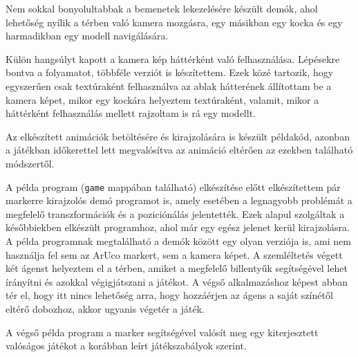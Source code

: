 Nem sokkal bonyolultabbak a bemenetek lekezelésére készült demók, ahol lehetőség nyílik a térben való kamera mozgásra, egy másikban egy kocka és egy harmadikban egy modell navigálására.

Külön hangsúlyt kapott a kamera kép háttérként való felhasználása. Lépésekre bontva a folyamatot, többféle verziót is készítettem. Ezek közé tartozik, hogy egyszerűen csak textúraként felhasználva az ablak hátterének állítottam be a kamera képet, mikor egy kockára helyeztem textúraként, valamit, mikor a háttérként felhasználás mellett rajzoltam is rá egy modellt.

Az elkészített animációk betöltésére és kirajzolására is készült példakód, azonban a játékban időkerettel lett megvalósítva az animáció eltérően az ezekben található módszertől.

A példa program (\texttt{game} mappában található) elkészítése előtt elkészítettem pár markerre kirajzolós demó programot is, amely esetében a legnagyobb problémát a megfelelő transzformációk és
a poziciónálás jelentették. Ezek alapul szolgáltak a későbbiekben elkészült programhoz, ahol már egy egész jelenet kerül kirajzolásra.
A példa programnak megtalálható a demók között egy olyan verziója is, ami nem használja fel sem az ArUco markert, sem a kamera képet. 
A szemléltetés végett két ágenst helyeztem el a térben, amiket a megfelelő billentyűk segítségével lehet írányítni és azokkal végigjátszani a játékot.
A végső alkalmazáshoz képest abban tér el, hogy itt nincs lehetőség arra, hogy hozzáérjen az ágens a saját színétől eltérő dobozhoz, akkor ugyanis végetér a játék.

A végső példa program a marker segítségével valósít meg egy kiterjesztett valóságos játékot a korábban leírt játékszabályok szerint.
